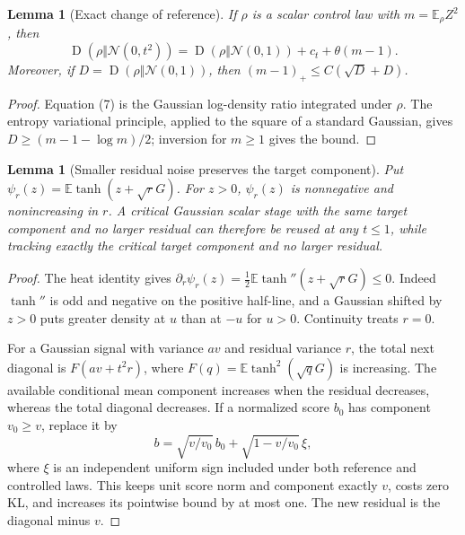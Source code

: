 \documentclass[11pt]{article}
\newtheorem{lemma}[theorem]{Lemma}
\theoremstyle{remark}\newtheorem{remark}[theorem]{Remark}
\newcommand{\E}{\mathbb E}\newcommand{\R}{\mathbb R}
\newcommand{\KL}{\operatorname{D}}\newcommand{\poly}{\operatorname{poly}}
\begin{document}
\begin{lemma}[Exact change of reference]
If $\rho$ is a scalar control law with $m=\E_\rho Z^2$, then
\[
 \KL(\rho\Vert\mathcal N(0,t^2))
 =\KL(\rho\Vert\mathcal N(0,1))+c_t+\theta(m-1).    \tag{7}
\]
Moreover, if $D=\KL(\rho\Vert\mathcal N(0,1))$, then
$(m-1)_+\le C(\sqrt D+D)$.
\end{lemma}
\begin{proof}
Equation (7) is the Gaussian log-density ratio integrated under
$\rho$. The entropy variational principle, applied to the square of
a standard Gaussian, gives $D\ge(m-1-\log m)/2$; inversion for
$m\ge1$ gives the bound.
\end{proof}

\begin{lemma}[Smaller residual noise preserves the target component]
Put $\psi_r(z)=\E\tanh(z+\sqrt rG)$. For $z>0$, $\psi_r(z)$ is
nonnegative and nonincreasing in $r$. A critical Gaussian scalar
stage with the same target component and no larger residual can
therefore be reused at any $t\le1$, while tracking exactly the
critical target component and no larger residual.
\end{lemma}
\begin{proof}
The heat identity gives
$\partial_r\psi_r(z)=\tfrac12\E\tanh''(z+\sqrt rG)\le0$.
Indeed $\tanh''$ is odd and negative on the positive half-line,
and a Gaussian shifted by $z>0$ puts greater density at $u$ than at
$-u$ for $u>0$. Continuity treats $r=0$.

For a Gaussian signal with variance $av$ and residual variance $r$,
the total next diagonal is $F(av+t^2r)$, where
$F(q)=\E\tanh^2(\sqrt qG)$ is increasing. The available conditional
mean component increases when the residual decreases, whereas the
total diagonal decreases. If a normalized score $b_0$ has component
$v_0\ge v$, replace it by
\[
 b=\sqrt{v/v_0}\,b_0+\sqrt{1-v/v_0}\,\xi,
\]
where $\xi$ is an independent uniform sign included under both
reference and controlled laws. This keeps unit score norm and
component exactly $v$, costs zero KL, and increases its pointwise
bound by at most one. The new residual is the diagonal minus $v$.
\end{proof}
\end{document}
